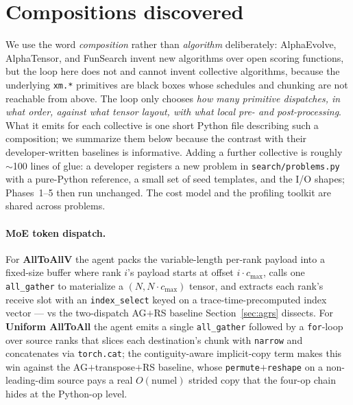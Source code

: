 \section{Compositions discovered}
\label{sec:algos}

We use the word \emph{composition} rather than \emph{algorithm}
deliberately: AlphaEvolve, AlphaTensor, and FunSearch invent new
algorithms over open scoring functions, but the loop here does not
and cannot invent collective algorithms, because the underlying
\texttt{xm.*} primitives are black boxes whose schedules and chunking
are not reachable from above. The loop only chooses \emph{how many
primitive dispatches, in what order, against what tensor layout,
with what local pre- and post-processing}. What it emits for each
collective is one short Python file describing such a composition;
we summarize them below because the contrast with their
developer-written baselines is informative. Adding a further
collective is roughly $\sim$100 lines of glue: a developer
registers a new problem in \texttt{search/problems.py} with a
pure-Python reference, a small set of seed templates, and the I/O
shapes; Phases~1--5 then run unchanged. The cost model and the
profiling toolkit are shared across problems.

\paragraph{MoE token dispatch.} For \textbf{AllToAllV} the agent
packs the variable-length per-rank payload into a fixed-size buffer
where rank $i$'s payload starts at offset $i \cdot c_{\max}$, calls
one \texttt{all\_gather} to materialize a $(N, N \cdot c_{\max})$
tensor, and extracts each rank's receive slot with an
\texttt{index\_select} keyed on a trace-time-precomputed index vector
--- vs the two-dispatch AG$+$RS baseline Section~\ref{sec:agrs}
dissects. For \textbf{Uniform AllToAll} the agent emits a single
\texttt{all\_gather} followed by a \texttt{for}-loop over source
ranks that slices each destination's chunk with \texttt{narrow} and
concatenates via \texttt{torch.cat}; the contiguity-aware
implicit-copy term makes this win against the AG$+$transpose$+$RS
baseline, whose \texttt{permute$+$reshape} on a non-leading-dim
source pays a real $O(\text{numel})$ strided copy that the four-op
chain hides at the Python-op level.

